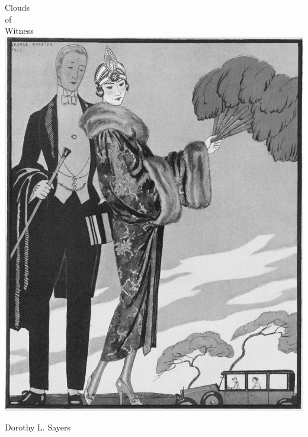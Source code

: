 \documentclass[
paper=5.5in:8.5in,
BCOR=7mm,
twoside,
DIV=calc,
11pt,
usegeometry,
chapterprefix,
headings=big]{scrbook} %
\newcommand{\moderatelyhuge}{\fontsize{40}{50}\selectfont}
\newcommand{\reasonablyhuge}{\fontsize{30}{40}\selectfont}
\def\coverimagesize{0.7\linewidth}
\newcommand{\HUGE}{\fontsize{50}{60}\selectfont}
\def\coverimagesize{0.8\linewidth}
\newcommand{\HUGE}{\fontsize{60}{70}\selectfont}
\begin{document}
\setlength{\epigraphwidth}{0.8\textwidth}
\renewcommand{\epigraphflush}{center}
\renewcommand{\sourceflush}{center}
\renewcommand*{\chaptermarkformat}{}
\renewcommand*{\chapterheadendvskip}{\vspace{10pt}}
\renewcommand*{\chapterheadstartvskip}{\vspace{0pt}}

\frontmatter
\pagestyle{empty}
\begin{titlepage}
   \recalctypearea

  \begin{center}\mytitlefont
{\HUGE Clouds}\\
\vspace{0.5cm}
{\moderatelyhuge of}\\
\vspace{0.2cm}
{\HUGE Witness}\\
\vspace*{.5cm}
\includegraphics[width=\coverimagesize]{casino}\\
 \end{center}
 \vspace*{.1cm}
 \begin{center}\myauthorfont
{\reasonablyhuge Dorothy L. Sayers}\\
\end{center}
  \end{titlepage}
\end{document}
